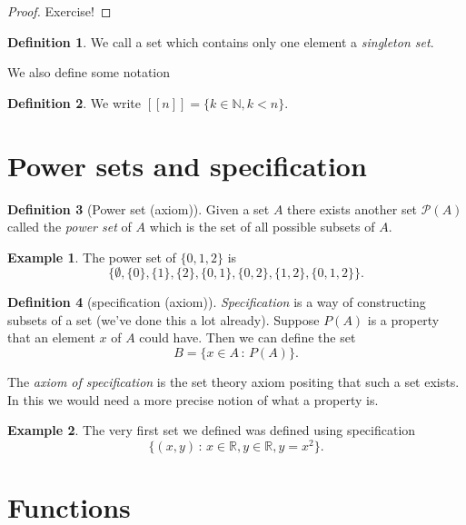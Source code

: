 \documentclass[
]{book}
\theoremstyle{definition}
\newtheorem{definition}{Definition}[chapter]
\theoremstyle{definition}
\newtheorem{example}{Example}[chapter]
\theoremstyle{definition}
\theoremstyle{definition}
\theoremstyle{remark}
\begin{document}
\begin{proof}
Exercise!
\end{proof}

\begin{definition}
We call a set which contains only one element a \emph{singleton set}.
\end{definition}

We also define some notation

\begin{definition}
We write \([[n]]= \{ k\in \mathbb{N}, k < n\}\).
\end{definition}

\section{Power sets and specification}\label{power-sets-and-specification}

\begin{definition}[Power set (axiom)]
Given a set \(A\) there exists another set \(\mathcal{P}(A)\) called the \emph{power set} of \(A\) which is the set of all possible subsets of \(A\).
\end{definition}

\begin{example}
The power set of \(\{0,1,2\}\) is
\[ \{ \emptyset, \{0\}, \{1\}, \{2\}, \{0,1\}, \{0,2\}, \{1,2\}, \{0,1,2\}\}.  \]
\end{example}

\begin{definition}[specification (axiom)]
\emph{Specification} is a way of constructing subsets of a set (we've done this a lot already). Suppose \(P(A)\) is a property that an element \(x\) of \(A\) could have. Then we can define the set
\[ B = \{ x \in A \,:\, P(A)\}.  \]
\end{definition}

The \emph{axiom of specification} is the set theory axiom positing that such a set exists. In this we would need a more precise notion of what a property is.

\begin{example}
The very first set we defined was defined using specification
\[ \{(x, y)\,:\, x \in \mathbb{R}, y \in \mathbb{R}, y=x^2\}.  \]
\end{example}

\section{Functions}\label{functions}
\end{document}
